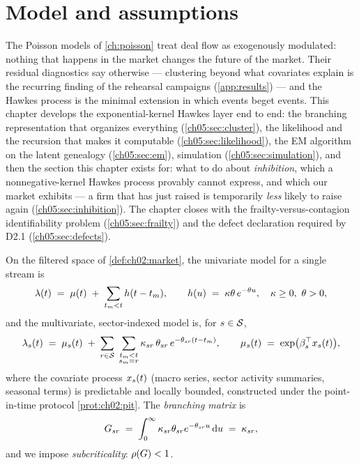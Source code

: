 
\section{Model and assumptions}\label{ch05:sec:model}

The Poisson models of \cref{ch:poisson} treat deal flow as exogenously
modulated: nothing that happens in the market changes the future of the
market. Their residual diagnostics say otherwise --- clustering beyond what
covariates explain is the recurring finding of the rehearsal campaigns
(\cref{app:results}) --- and the Hawkes process \citep{hawkes1971} is the
minimal extension in which events beget events. This chapter develops the
exponential-kernel Hawkes layer end to end: the branching representation
that organizes everything (\cref{ch05:sec:cluster}), the likelihood and the
recursion that makes it computable (\cref{ch05:sec:likelihood}), the EM
algorithm on the latent genealogy (\cref{ch05:sec:em}), simulation
(\cref{ch05:sec:simulation}), and then the section this chapter exists for:
what to do about \emph{inhibition}, which a nonnegative-kernel Hawkes
process provably cannot express, and which our market exhibits --- a firm
that has just raised is temporarily \emph{less} likely to raise again
(\cref{ch05:sec:inhibition}). The chapter closes with the
frailty-versus-contagion identifiability problem
(\cref{ch05:sec:frailty}) and the defect declaration required by D2.1
(\cref{ch05:sec:defects}).

\begin{assumption}\label{asm:ch05:model}
On the filtered space of \cref{def:ch02:market}, the univariate model for a
single stream is
\begin{equation}\label{eq:ch05:uni}
\lambda(t) \;=\; \mu(t) \;+\; \sum_{t_m < t} h(t - t_m),
\qquad
h(u) \;=\; \kappa\theta\, e^{-\theta u},
\quad \kappa \ge 0,\ \theta > 0,
\end{equation}
and the multivariate, sector-indexed model is, for $s \in \mathcal{S}$,
\begin{equation}\label{eq:ch05:multi}
\lambda_s(t) \;=\; \mu_s(t) \;+\; \sum_{r \in \mathcal{S}}\;
\sum_{\substack{t_m < t \\ s_m = r}}
\kappa_{sr}\,\theta_{sr}\, e^{-\theta_{sr}(t - t_m)},
\qquad
\mu_s(t) \;=\; \exp\!\big(\beta_s^{\top} x_s(t)\big),
\end{equation}
where the covariate process $x_s(t)$ (macro series, sector activity
summaries, seasonal terms) is predictable and locally bounded, constructed
under the point-in-time protocol \cref{prot:ch02:pit}. The
\emph{branching matrix} is
\begin{equation}\label{eq:ch05:gmat}
G_{sr} \;=\; \int_0^{\infty} \kappa_{sr}\theta_{sr} e^{-\theta_{sr}u}
\,\mathrm{d} u \;=\; \kappa_{sr},
\end{equation}
and we impose \emph{subcriticality}: $\rho\!\left(G\right) < 1$.
\end{assumption}

